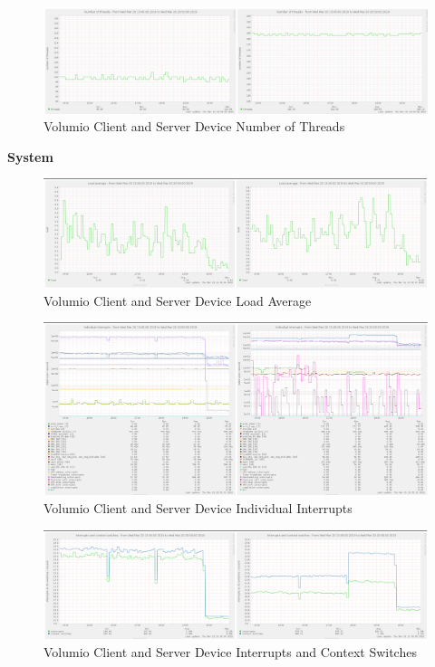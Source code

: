 \documentclass[11pt,a4paper,headinclude=false,footinclude=false]{scrreprt}
\begin{document}
\begin{figure}[H]
\includegraphics{ResultsAndAnalysis/VolumioServerTestImages/019VolumioNoOfThreads.png}
\centering
\caption{Volumio Client and Server Device Number of Threads}
\label{VolumioNumThreads}
\end{figure}

\textbf{System}

\begin{figure}[H]
\includegraphics{ResultsAndAnalysis/VolumioServerTestImages/016VolumioLoadAverage.png}
\centering
\caption{Volumio Client and Server Device Load Average}
\label{VolumioLoadAvg}
\end{figure}

\begin{figure}[H]
\includegraphics{ResultsAndAnalysis/VolumioServerTestImages/014VolumioIndividualInterrupts.png}
\centering
\caption{Volumio Client and Server Device Individual Interrupts}
\label{VolumioIndInt}
\end{figure}

\begin{figure}[H]
\includegraphics{ResultsAndAnalysis/VolumioServerTestImages/015VolumioInterruptsAndContextSwitches.png}
\centering
\caption{Volumio Client and Server Device Interrupts and Context Switches}
\label{VolumioIntCont}
\end{figure}
\end{document}
